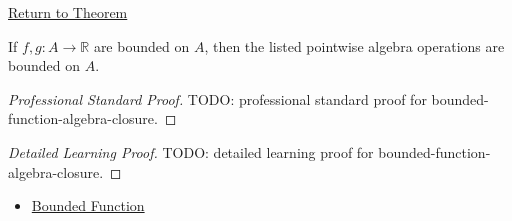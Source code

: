 \newpage
{}
\label{prf:bounded-function-algebra-closure}

\begin{remark*}[Return]
\hyperref[thm:bounded-function-algebra-closure]{Return to Theorem}
\end{remark*}

\begin{theorem*}
If \(f,g:A\to\mathbb{R}\) are bounded on \(A\), then the listed pointwise
algebra operations are bounded on \(A\).
\end{theorem*}

\begin{proof}[Professional Standard Proof]
\LRAProofBodyStart
TODO: professional standard proof for bounded-function-algebra-closure.
\end{proof}

\begin{proof}[Detailed Learning Proof]
\LRAProofBodyStart
TODO: detailed learning proof for bounded-function-algebra-closure.
\end{proof}

\begin{remark*}
\end{remark*}

\begin{dependencies}
\begin{itemize}
  \item \hyperref[def:function-bounded]{Bounded Function}
\end{itemize}
\end{dependencies}

\clearpage
